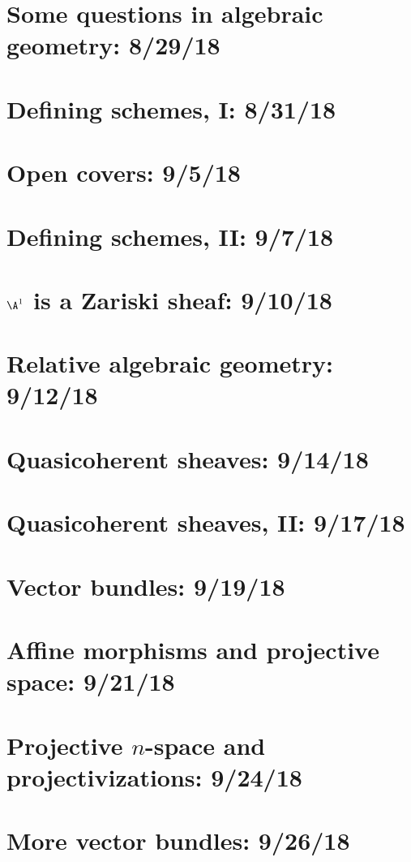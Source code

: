 \documentclass{notes_d}
\begin{document}
\frontstuff

\section{Some questions in algebraic geometry: 8/29/18}
	
\section{Defining schemes, I: 8/31/18}
	
\section{Open covers: 9/5/18}
	
\section{Defining schemes, II: 9/7/18}
	
\section{$\A^1$ is a Zariski sheaf: 9/10/18}
	
\section{Relative algebraic geometry: 9/12/18}
	
\section{Quasicoherent sheaves: 9/14/18}
	
\section{Quasicoherent sheaves, II: 9/17/18}
	
\section{Vector bundles: 9/19/18}
	
\section{Affine morphisms and projective space: 9/21/18}
	
\section{Projective $n$-space and projectivizations: 9/24/18}
	
\section{More vector bundles: 9/26/18}
	
\end{document}
